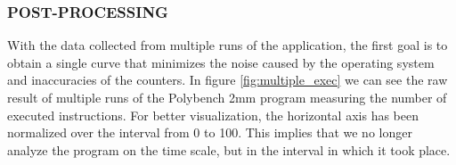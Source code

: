 
\subsubsection{POST-PROCESSING}
\label{sec:posprocessing}

With the data collected from multiple runs of the application, the first goal is to obtain a single curve that minimizes the noise caused by the operating system and inaccuracies of the counters. 
In figure \ref{fig:multiple_exec} we can see the raw result of multiple runs of the Polybench 2mm program measuring the number of executed instructions. 
For better visualization, the horizontal axis has been normalized over the interval from 0 to 100. 
This implies that we no longer analyze the program on the time scale, but in the interval in which it took place.

